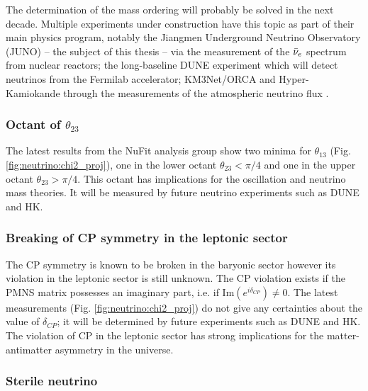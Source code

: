 The determination of the mass ordering will probably be solved in the next decade. Multiple experiments under construction have this topic as part of their main physics program, notably the Jiangmen Underground Neutrino Observatory (JUNO) \cite{juno_collaboration_juno_2022} -- the subject of this thesis -- via the measurement of the $\bar{\nu}_{e}$ spectrum from nuclear reactors; the long-baseline DUNE experiment \cite{abi_long-baseline_2020} which will detect neutrinos from the Fermilab accelerator; KM3Net/ORCA and Hyper-Kamiokande through the measurements of the atmospheric neutrino flux \cite{aiello_determining_2021, abe_hyper-kamiokande_2018}.

\subsubsection{Octant of $\theta_{23}$}

The latest results from the NuFit analysis group \cite{esteban_nufit-60_2024} show two minima for $\theta_{13}$ (Fig. \ref{fig:neutrino:chi2_proj}), one in the lower octant $\theta_{23} < \pi/4$ and one in the upper octant $\theta_{23} > \pi/4$. This octant has implications for the oscillation and neutrino mass theories. It will be measured by future neutrino experiments such as DUNE and HK.

\subsubsection{Breaking of CP symmetry in the leptonic sector}

The CP symmetry is known to be broken in the baryonic sector \cite{christenson_evidence_1964} however its violation in the leptonic sector is still unknown. The CP violation exists if the PMNS matrix possesses an imaginary part, i.e. if $\text{Im}(e^{i\delta_{CP}}) \neq 0$. The latest measurements (Fig. \ref{fig:neutrino:chi2_proj}) do not give any certainties about the value of $\delta_{CP}$; it will be determined by future experiments such as DUNE and HK. The violation of CP in the leptonic sector has strong implications for the matter-antimatter asymmetry in the universe.

\subsubsection{Sterile neutrino}

